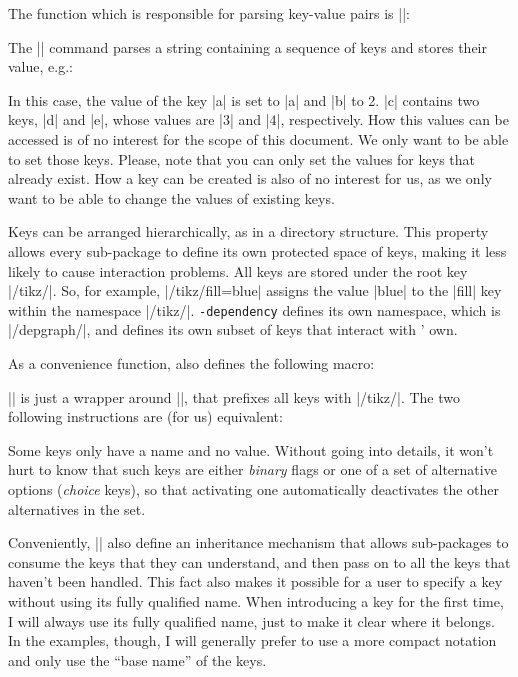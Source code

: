 \documentclass[a4paper]{ltxdoc}
\def\pkgname{\tikzname{}\texttt{-dependency}}
\begin{document}
The function which is responsible for parsing key-value pairs is |\pgfkeys|:

\begin{command}{\pgfkeys{}}
   The |\pgfkeys| command parses a string containing a sequence of keys and stores their value, e.g.:
\begin{codeexample}
\end{codeexample}
In this case, the value of the key |a| is set to |a| and |b| to 2. |c| contains two keys, |d| and |e|, whose values are |3| and |4|, respectively. How this values can be accessed is of no interest for the scope of this document. We only want to be able to set those keys. Please, note that you can only set the values for keys that already exist. How a key can be created is also of no interest for us, as we only want to be able to change the values of existing keys.
\end{command}

Keys can be arranged hierarchically, as in a directory structure. This property allows every sub-package to define its own protected space of keys, making it less likely to cause interaction problems. All \tikzname{} keys are stored under the root key |/tikz/|. So, for example, |/tikz/fill=blue| assigns the value |blue| to the |fill| key within the namespace |/tikz/|. \pkgname{} defines its own namespace, which is |/depgraph/|, and defines its own subset of keys that interact with \tikzname{}' own. 

As a convenience function, \tikzname{} also defines the following macro:

\begin{command}{\tikzset{}}
   |\tikzset| is just a wrapper around |\pgfkeys|, that prefixes all keys with |/tikz/|. The two following instructions are (for us) equivalent:
\begin{codeexample}
   \tikzset{text=red, fill=white}
\end{codeexample}
\end{command}

Some keys only have a name and no value. Without going into details, it won't hurt to know that such keys are either \emph{binary} flags or one of a set of alternative options (\emph{choice} keys), so that activating one automatically deactivates the other alternatives in the set.

Conveniently, |\pgfkeys| also define an inheritance mechanism that allows sub-packages to consume the keys that they can understand, and then pass on to \tikzname{} all the keys that haven't been handled. This fact also makes it possible for a user to specify a key without using its fully qualified name. When introducing a key for the first time, I will always use its fully qualified name, just to make it clear where it belongs. In the examples, though, I will generally prefer to use a more compact notation and only use the ``base name'' of the keys.
\end{document}
